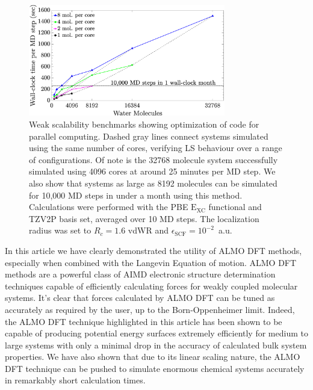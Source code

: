 \documentclass[aps,prl,reprint,amsmath,amssymb]{revtex4-1}
\begin{document}
\begin{figure}
\includegraphics[trim={1.6cm 0cm 4.7cm 0cm},clip,width=8.6cm]{weakscaling.eps}
\caption{\label{fig:weakscaling} Weak scalability benchmarks showing optimization of code for parallel computing.
Dashed gray lines connect systems simulated using the same number of cores, verifying LS behaviour over a range of configurations.
Of note is the 32768 molecule system successfully simulated using 4096 cores at around 25 minutes per MD step.
We also show that systems as large as 8192 molecules can be simulated for 10,000 MD steps in under a month using this method.
Calculations were performed with the PBE $\mathrm{E_{XC}}$ functional and TZV2P basis set, averaged over 10 MD steps. 
The localization radius was set to $R_{c} = 1.6$ vdWR and $\epsilon_{\text{SCF}} = 10^{-2}$~a.u.}
\end{figure}


In this article we have clearly demonstrated the utility of ALMO DFT methods, especially when combined with the Langevin Equation of motion.
ALMO DFT methods are a powerful class of AIMD electronic structure determination techniques capable of efficiently calculating forces for weakly coupled molecular systems.
It's clear that forces calculated by ALMO DFT can be tuned as accurately as required by the user, up to the Born-Oppenheimer limit.
Indeed, the ALMO DFT technique highlighted in this article has been shown to be capable of producing potential energy surfaces extremely efficiently for medium to large systems with only a minimal drop in the accuracy of calculated bulk system properties.
We have also shown that due to its linear scaling nature, the ALMO DFT technique can be pushed to simulate enormous chemical systems accurately in remarkably short calculation times.
\end{document}

